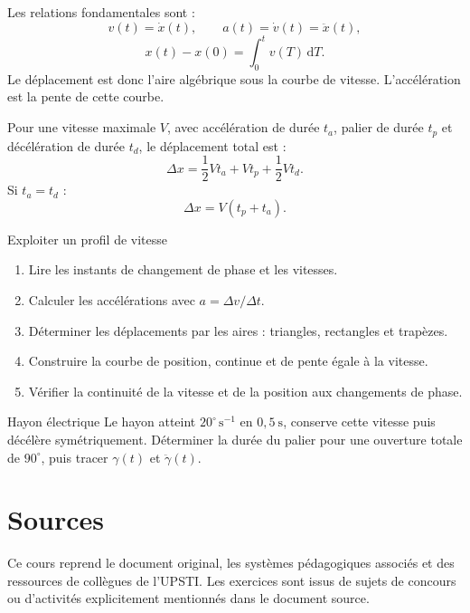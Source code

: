 \begin{center}
\end{center}

Les relations fondamentales sont :
\[
v(t)=\dot x(t),
\qquad
a(t)=\dot v(t)=\ddot x(t),
\]
\[
\boxed{x(t)-x(0)=\int_0^t v(T)\,\mathrm dT.}
\]
Le déplacement est donc l'aire algébrique sous la courbe de vitesse.
L'accélération est la pente de cette courbe.

Pour une vitesse maximale $V$, avec accélération de durée $t_a$, palier
de durée $t_p$ et décélération de durée $t_d$, le déplacement total est :
\[
\boxed{
\Delta x=\frac12Vt_a+Vt_p+\frac12Vt_d.}
\]
Si $t_a=t_d$ :
\[
\Delta x=V(t_p+t_a).
\]

\begin{TLCineMethod}{Exploiter un profil de vitesse}
\begin{enumerate}
  \item Lire les instants de changement de phase et les vitesses.
  \item Calculer les accélérations avec $a=\Delta v/\Delta t$.
  \item Déterminer les déplacements par les aires : triangles, rectangles et trapèzes.
  \item Construire la courbe de position, continue et de pente égale à la vitesse.
  \item Vérifier la continuité de la vitesse et de la position aux changements de phase.
\end{enumerate}
\end{TLCineMethod}

\begin{TLCineApp}{Hayon électrique}
Le hayon atteint $20^\circ\,\mathrm{s^{-1}}$ en $0{,}5\ \mathrm s$,
conserve cette vitesse puis décélère symétriquement. Déterminer la durée
du palier pour une ouverture totale de $90^\circ$, puis tracer
$\gamma(t)$ et $\ddot\gamma(t)$.
\end{TLCineApp}

\section{Sources}
\label{sec:cine-sources}

Ce cours reprend le document original, les systèmes pédagogiques
associés et des ressources de collègues de l'UPSTI. Les exercices sont
issus de sujets de concours ou d'activités explicitement mentionnés dans
le document source.
